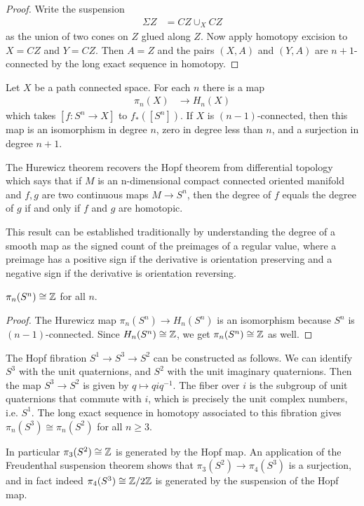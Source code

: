 \documentclass[12pt]{article}
\begin{document}
\begin{proof}
    Write the suspension \begin{align*}
        \Sigma Z & = CZ \cup_X CZ
     \end{align*} as the union of two cones on $Z$ glued along $Z$. Now apply homotopy excision to $X = CZ$ and $Y = CZ$. Then $A = Z$ and the pairs $(X,A)$ and $(Y,A)$ are $n+1$-connected by the long exact sequence in homotopy.
\end{proof}

\begin{theorem}
     Let $X$ be a path connected space. For each $n$ there is a map \begin{align*}
    \pi_n(X) & \to H_n(X)
    \end{align*} which takes $[f:S^n \to X]$ to $f_*([S^n])$. If $X$ is $(n-1)$-connected, then this map is an isomorphism in degree $n$, zero in degree less than $n$, and a surjection in degree $n+1$.
\end{theorem}

The Hurewicz theorem recovers the Hopf theorem from differential topology which says that if $M$ is an n-dimensional compact connected oriented manifold and $f,g$ are two continuous maps $M \to S^n$, then the degree of $f$ equals the degree of $g$ if and only if $f$ and $g$ are homotopic. 

This result can be established traditionally by understanding the degree of a smooth map as the signed count of the preimages of a regular value, where a preimage has a positive sign if the derivative is orientation preserving and a negative sign if the derivative is orientation reversing. 

\begin{corollary}
    $\pi_n(S^n) \cong \mathbb{Z}$ for all $n$.
\end{corollary}

\begin{proof}
    The Hurewicz map $\pi_n(S^n) \to H_n(S^n)$ is an isomorphism because $S^n$ is $(n-1)$-connected. Since $H_n(S^n) \cong \mathbb{Z}$, we get $\pi_n(S^n) \cong \mathbb{Z}$ as well.
\end{proof}

\begin{example}
    The Hopf fibration $S^1 \to S^3 \to S^2$ can be constructed as follows. We can identify $S^3$ with the unit quaternions, and $S^2$ with the unit imaginary quaternions. Then the map $S^3 \to S^2$ is given by $q \mapsto q i q^{-1}$. The fiber over $i$ is the subgroup of unit quaternions that commute with $i$, which is precisely the unit complex numbers, i.e. $S^1$. The long exact sequence in homotopy associated to this fibration gives $\pi_n(S^3) \cong \pi_n(S^2)$ for all $n\ge 3$.

In particular $\pi_3(S^2) \cong \mathbb{Z}$ is generated by the Hopf map. An application of the Freudenthal suspension theorem shows that $\pi_3(S^2) \to \pi_4(S^3)$ is a surjection, and in fact indeed $\pi_4(S^3) \cong \mathbb{Z}/2\mathbb{Z}$ is generated by the suspension of the Hopf map. 
\end{example}
\end{document}
